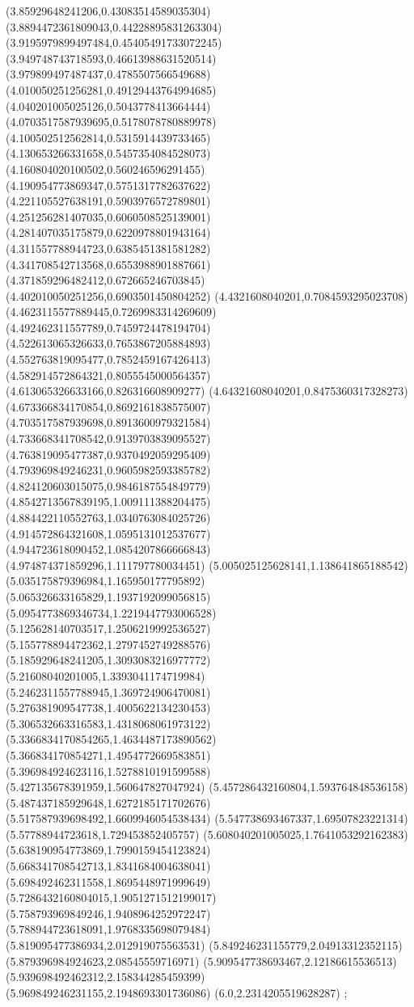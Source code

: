 {(3.85929648241206,0.43083514589035304)
(3.8894472361809043,0.44228895831263304)
(3.9195979899497484,0.45405491733072245)
(3.949748743718593,0.46613988631520514)
(3.979899497487437,0.4785507566549688)
(4.010050251256281,0.49129443764994685)
(4.040201005025126,0.5043778413664444)
(4.0703517587939695,0.5178078780889978)
(4.100502512562814,0.5315914439733465)
(4.130653266331658,0.5457354084528073)
(4.160804020100502,0.560246596291455)
(4.190954773869347,0.5751317782637622)
(4.221105527638191,0.5903976572789801)
(4.251256281407035,0.6060508525139001)
(4.281407035175879,0.6220978801943164)
(4.311557788944723,0.6385451381581282)
(4.341708542713568,0.6553988901887661)
(4.371859296482412,0.672665246703845)
(4.402010050251256,0.6903501450804252)
(4.4321608040201,0.7084593295023708)
(4.4623115577889445,0.7269983314269609)
(4.492462311557789,0.7459724478194704)
(4.522613065326633,0.7653867205884893)
(4.552763819095477,0.7852459167426413)
(4.582914572864321,0.8055545000564357)
(4.613065326633166,0.826316608909277)
(4.64321608040201,0.8475360317328273)
(4.673366834170854,0.8692161838575007)
(4.703517587939698,0.8913600979321584)
(4.733668341708542,0.9139703839095527)
(4.763819095477387,0.9370492059295409)
(4.793969849246231,0.9605982593385782)
(4.824120603015075,0.9846187554849779)
(4.8542713567839195,1.009111388204475)
(4.884422110552763,1.0340763084025726)
(4.914572864321608,1.0595131012537677)
(4.944723618090452,1.0854207866666843)
(4.974874371859296,1.111797780034451)
(5.005025125628141,1.138641865188542)
(5.035175879396984,1.165950177795892)
(5.065326633165829,1.1937192099056815)
(5.0954773869346734,1.2219447793006528)
(5.125628140703517,1.2506219992536527)
(5.155778894472362,1.2797452749288576)
(5.185929648241205,1.3093083216977772)
(5.21608040201005,1.3393041174719984)
(5.2462311557788945,1.369724906470081)
(5.276381909547738,1.4005622134230453)
(5.306532663316583,1.4318068061973122)
(5.3366834170854265,1.4634487173890562)
(5.366834170854271,1.4954772669583851)
(5.396984924623116,1.5278810191599588)
(5.427135678391959,1.560647827047924)
(5.457286432160804,1.593764848536158)
(5.487437185929648,1.6272185171702676)
(5.517587939698492,1.6609946054538434)
(5.547738693467337,1.69507823221314)
(5.57788944723618,1.729453852405757)
(5.608040201005025,1.7641053292162383)
(5.638190954773869,1.7990159454123824)
(5.668341708542713,1.8341684004638041)
(5.698492462311558,1.8695448971999649)
(5.7286432160804015,1.9051271512199017)
(5.758793969849246,1.9408964252972247)
(5.788944723618091,1.9768335698079484)
(5.819095477386934,2.012919075563531)
(5.849246231155779,2.04913312352115)
(5.879396984924623,2.08545559716971)
(5.909547738693467,2.12186615536513)
(5.939698492462312,2.158344285459399)
(5.969849246231155,2.1948693301736086)
(6.0,2.2314205519628287)
};
